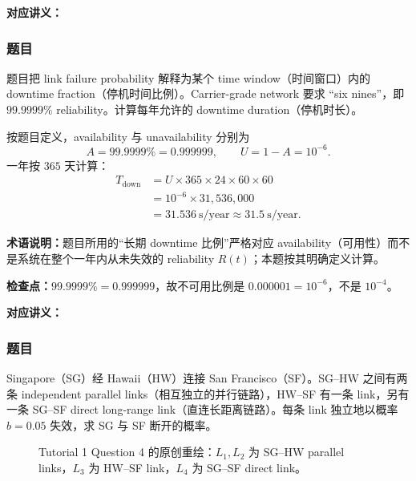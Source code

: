 
\textbf{对应讲义：}

\subsubsection*{题目}

题目把 link failure probability 解释为某个 time window（时间窗口）内的 downtime fraction（停机时间比例）。Carrier-grade network 要求 ``six nines''，即 $99.9999\%$ reliability。计算每年允许的 downtime duration（停机时长）。

\begin{checkedsolution}
按题目定义，availability 与 unavailability 分别为
\[
  A=99.9999\%=0.999999,
  \qquad
  U=1-A=10^{-6}.
\]
一年按 $365$ 天计算：
\begin{align*}
  T_{\mathrm{down}}
    &=U\times365\times24\times60\times60\\
    &=10^{-6}\times31{,}536{,}000\\
    &=\boxed{31.536\ \text{s/year}}
    \approx31.5\ \text{s/year}.
\end{align*}

\textbf{术语说明：}题目所用的“长期 downtime 比例”严格对应 availability（可用性）而不是系统在整个一年内从未失效的 reliability $R(t)$；本题按其明确定义计算。
\end{checkedsolution}

\textbf{检查点：}$99.9999\%=0.999999$，故不可用比例是 $0.000001=10^{-6}$，不是 $10^{-4}$。


\textbf{对应讲义：}

\subsubsection*{题目}

Singapore（SG）经 Hawaii（HW）连接 San Francisco（SF）。SG--HW 之间有两条 independent parallel links（相互独立的并行链路），HW--SF 有一条 link，另有一条 SG--SF direct long-range link（直连长距离链路）。每条 link 独立地以概率 $b=0.05$ 失效，求 SG 与 SF 断开的概率。

\begin{figure}[htbp]
  \centering
  \resizebox{0.78\textwidth}{!}{}
  \caption{Tutorial 1 Question 4 的原创重绘：$L_1,L_2$ 为 SG--HW parallel links，$L_3$ 为 HW--SF link，$L_4$ 为 SG--SF direct link。}
  \label{fig:sc2008-tut01-resilience-topology}
\end{figure}

